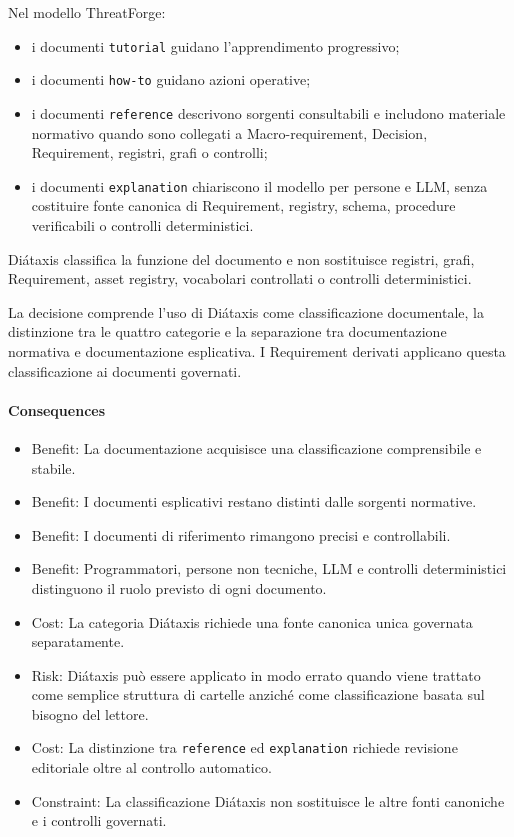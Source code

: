 \documentclass[
  10pt,
]{article}
\providecommand{\tightlist}{%
  \setlength{\itemsep}{0pt}\setlength{\parskip}{0pt}}
\begin{document}
Nel modello ThreatForge:

\begin{itemize}
\tightlist
\item
  i documenti \texttt{tutorial} guidano l'apprendimento progressivo;
\item
  i documenti \texttt{how-to} guidano azioni operative;
\item
  i documenti \texttt{reference} descrivono sorgenti consultabili e
  includono materiale normativo quando sono collegati a
  Macro-requirement, Decision, Requirement, registri, grafi o controlli;
\item
  i documenti \texttt{explanation} chiariscono il modello per persone e
  LLM, senza costituire fonte canonica di Requirement, registry, schema,
  procedure verificabili o controlli deterministici.
\end{itemize}

Diátaxis classifica la funzione del documento e non sostituisce
registri, grafi, Requirement, asset registry, vocabolari controllati o
controlli deterministici.

La decisione comprende l'uso di Diátaxis come classificazione
documentale, la distinzione tra le quattro categorie e la separazione
tra documentazione normativa e documentazione esplicativa. I Requirement
derivati applicano questa classificazione ai documenti governati.

\paragraph{Consequences}\label{consequences}

\begin{itemize}
\tightlist
\item
  Benefit: La documentazione acquisisce una classificazione
  comprensibile e stabile.
\item
  Benefit: I documenti esplicativi restano distinti dalle sorgenti
  normative.
\item
  Benefit: I documenti di riferimento rimangono precisi e controllabili.
\item
  Benefit: Programmatori, persone non tecniche, LLM e controlli
  deterministici distinguono il ruolo previsto di ogni documento.
\item
  Cost: La categoria Diátaxis richiede una fonte canonica unica
  governata separatamente.
\item
  Risk: Diátaxis può essere applicato in modo errato quando viene
  trattato come semplice struttura di cartelle anziché come
  classificazione basata sul bisogno del lettore.
\item
  Cost: La distinzione tra \texttt{reference} ed \texttt{explanation}
  richiede revisione editoriale oltre al controllo automatico.
\item
  Constraint: La classificazione Diátaxis non sostituisce le altre fonti
  canoniche e i controlli governati.
\end{itemize}
\end{document}
